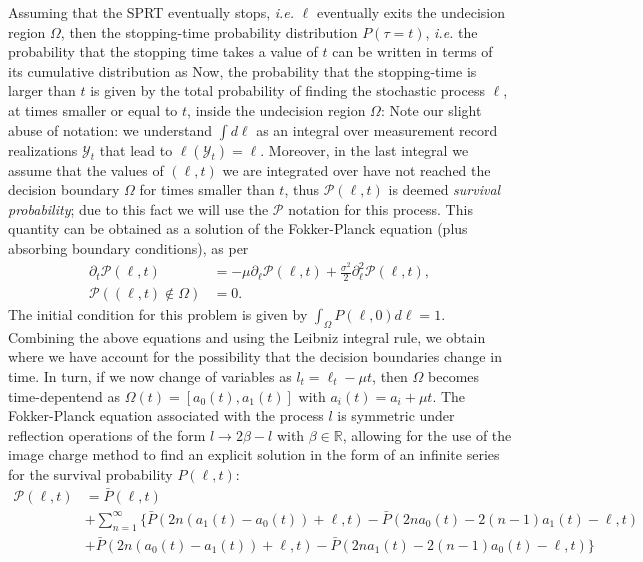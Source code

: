 Assuming that the SPRT eventually stops, \textit{i.e.} $\ell$ eventually exits the undecision region $\Omega$, then the stopping-time probability distribution $P(\tau=t)$, \textit{i.e.} the probability that the stopping time takes a value of $t$ can be written in terms of its cumulative distribution as
Now, the probability that the stopping-time is larger than $t$ is given by the total probability of finding the stochastic process $\ell$, at times smaller or equal to $t$, inside the undecision region $\Omega$:
Note our slight abuse of notation: we understand $\int d\ell$ as an integral over measurement record realizations $\mathcal{Y}_t$ that lead to $\ell(\mathcal{Y}_t) = \ell$. Moreover, in the last integral we assume that the values of $(\ell,t)$ we are integrated over have not reached the decision boundary $\Omega$ for times smaller than $t$, thus $\mathcal{P}(\ell, t)$ is deemed \textit{survival probability}; due to this fact we will use the $\mathcal{P}$ notation for this process. This quantity can be obtained as a solution of the Fokker-Planck equation (plus absorbing boundary conditions), as per
\begin{align}
\partial_t \mathcal{P}(\ell,t) &=  -\mu \partial_\ell \mathcal{P}(\ell,t)+ \frac{\sigma^2}{2} \partial^2_\ell \mathcal{P}(\ell,t),\\
\mathcal{P}((\ell,t) \notin \Omega) &= 0.
\end{align}
The initial condition for this problem is given by $\int_{\Omega} P(\ell,0)d\ell = 1$. Combining the above equations and using the Leibniz integral rule, we obtain
where we have account for the possibility that the decision boundaries change in time. In turn, if we now change of variables as $l_{t} = \ell_t - \mu t$, then $\Omega$ becomes time-depentend as $\Omega(t) = [a_0(t),a_1(t)]$ with $a_i(t) = a_i + \mu t$. The Fokker-Planck equation associated with the process $l$ is symmetric under reflection operations of the form $l\to 2\beta-l$ with $\beta \in \mathbb{R}$, allowing for the use of the image charge method to find an explicit solution in the form of an infinite series for the survival probability $P(\ell,t)$:
\begin{align}\label{eq:charge_seriess}
\mathcal{P}(\ell,t) &=\bar{P}(\ell,t)\\
&+\sum_{n=1}^{\infty}\Big\{ \bar{P}(2n(a_{1}(t)-a_{0}(t))+\ell,t) -  \bar{P}(2{n}a_{0}(t)-2(n-1)a_{1}(t)-\ell,t) \nonumber\\ \nonumber
&+\bar{P}(2n(a_{0}(t)-a_{1}(t))+\ell,t) - \bar{P}(2{n}a_{1}(t)-2(n-1)a_{0}(t)-\ell,t)\Big\}
\end{align}
